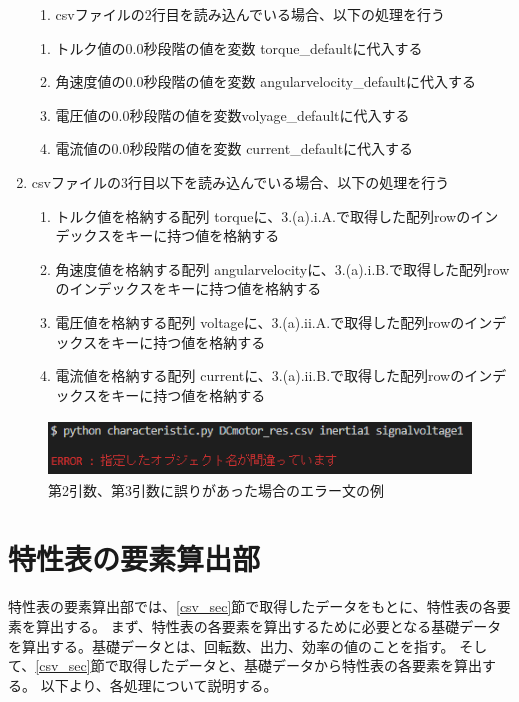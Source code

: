 \begin{enumerate}
\begin{enumerate}
        \item csvファイルの2行目を読み込んでいる場合、以下の処理を行う
    \end{enumerate}
        \begin{enumerate}
            \item トルク値の0.0秒段階の値を変数 torque\_defaultに代入する
            \item 角速度値の0.0秒段階の値を変数 angularvelocity\_defaultに代入する
            \item 電圧値の0.0秒段階の値を変数volyage\_defaultに代入する
            \item 電流値の0.0秒段階の値を変数 current\_defaultに代入する
        \end{enumerate}
        \item csvファイルの3行目以下を読み込んでいる場合、以下の処理を行う
        \begin{enumerate}
            \item トルク値を格納する配列 torqueに、3.(a).i.A.で取得した配列rowのインデックスをキーに持つ値を格納する
            \item 角速度値を格納する配列 angularvelocityに、3.(a).i.B.で取得した配列rowのインデックスをキーに持つ値を格納する
            \item 電圧値を格納する配列 voltageに、3.(a).ii.A.で取得した配列rowのインデックスをキーに持つ値を格納する
            \item 電流値を格納する配列 currentに、3.(a).ii.B.で取得した配列rowのインデックスをキーに持つ値を格納する
        \end{enumerate}
\end{enumerate}
\begin{figure}[t]
	\centering
	\includegraphics[width=12cm,height=1.5cm]{./Image/error_comand.png}
	\caption{第2引数、第3引数に誤りがあった場合のエラー文の例}
	\label{fig:error_comand}
\end{figure}
\section{特性表の要素算出部}\label{youso_sec}
特性表の要素算出部では、\ref{csv_sec}節で取得したデータをもとに、特性表の各要素を算出する。
まず、特性表の各要素を算出するために必要となる基礎データを算出する。基礎データとは、回転数、出力、効率の値のことを指す。
そして、\ref{csv_sec}節で取得したデータと、基礎データから特性表の各要素を算出する。
以下より、各処理について説明する。

